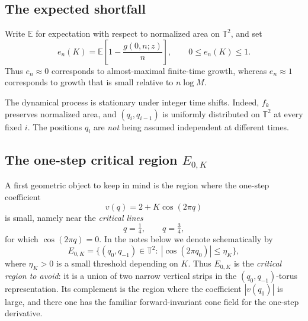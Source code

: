 \documentclass[11pt,a4paper]{article}
\newcommand{\T}{\mathbb{T}}
\newcommand{\EE}{\mathbb{E}}
\begin{document}
\subsection*{The expected shortfall}
Write $\EE$ for expectation with respect to normalized area on $\T^2$, and set
\begin{equation}\label{eq:en}
 \boxed{\quad e_n(K)=\EE\left[1-\frac{g(0,n;z)}{n}\right],\qquad 0\le e_n(K)\le1.\quad}
\end{equation}
Thus $e_n\approx0$ corresponds to almost-maximal finite-time growth, whereas $e_n\approx1$ corresponds to growth that is small relative to $n\log M$.

The dynamical process is stationary under integer time shifts. Indeed, $f_k$ preserves normalized area, and $(q_i,q_{i-1})$ is uniformly distributed on $\T^2$ at every fixed $i$. The positions $q_i$ are \emph{not} being assumed independent at different times.


\subsection*{The one-step critical region $E_{0,K}$}
A first geometric object to keep in mind is the region where the one-step coefficient
\[
 v(q)=2+K\cos(2\pi q)
\]
is small, namely near the \emph{critical lines}
\[
 q=\tfrac14,\qquad q=\tfrac34,
\]
for which $\cos(2\pi q)=0$. In the notes below we denote schematically by
\[
 E_{0,K}=\{(q_0,q_{-1})\in\T^2:\ |\cos(2\pi q_0)|\le \eta_K\},
\]
where $\eta_K>0$ is a small threshold depending on $K$. Thus $E_{0,K}$ is the
\emph{critical region to avoid}: it is a union of two narrow vertical strips in the
$(q_0,q_{-1})$-torus representation. Its complement is the region where the coefficient
$|v(q_0)|$ is large, and there one has the familiar forward-invariant cone field for the
one-step derivative.
\end{document}

